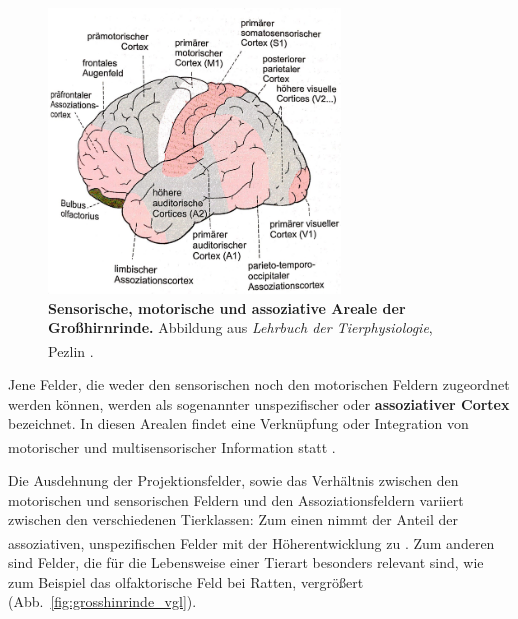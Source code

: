 \documentclass[12pt,a4paper,pdftex]{article}
\begin{document}
\begin{figure}[H]
    \centering
    \includegraphics[width=0.69\textwidth]{pictures/Bilder_Jule/Andere/Grosshirnrinde_sensorik_motorik.png}
    \caption[Sensorische, motorische und assoziative Areale der Großhirnrinde]{\textbf{Sensorische, motorische und assoziative Areale der Großhirnrinde.} Abbildung aus \textit{Lehrbuch der Tierphysiologie}, Pezlin \textsuperscript{\cite[14]{penzlin2005tierphys}}.}
    \label{fig:grosshirnrinde_sensorik_motorik}
\end{figure}

\noindent Jene Felder, die weder den sensorischen noch den motorischen Feldern zugeordnet werden können, werden als sogenannter unspezifischer oder \textbf{assoziativer Cortex} bezeichnet. In diesen Arealen findet eine Verknüpfung oder Integration von motorischer und multisensorischer Information statt \textsuperscript{\cite[14]{penzlin2005tierphys}}. 

\noindent Die Ausdehnung der Projektionsfelder, sowie das Verhältnis zwischen den motorischen und sensorischen Feldern und den Assoziationsfeldern variiert zwischen den verschiedenen Tierklassen: Zum einen nimmt der Anteil der assoziativen, unspezifischen Felder mit der Höherentwicklung zu \textsuperscript{\cite[14]{penzlin2005tierphys}}. Zum anderen sind Felder, die für die Lebensweise einer Tierart besonders relevant sind, wie zum Beispiel das olfaktorische Feld bei Ratten, vergrößert (Abb.~\ref{fig:grosshinrinde_vgl}).
\end{document}
